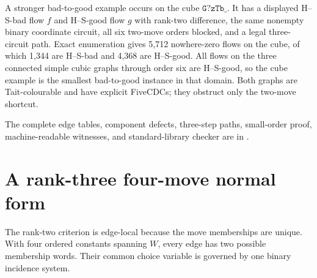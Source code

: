 \documentclass[11pt]{article}
\theoremstyle{definition}
\theoremstyle{remark}
\numberwithin{equation}{section}
\begin{document}
A stronger bad-to-good example occurs on the cube
\(\texttt{G?zTb\_}\).  It has a displayed H--S-bad flow \(f\) and
H--S-good flow \(g\) with rank-two difference, the same nonempty binary
coordinate circuit, all six two-move orders blocked, and a legal
three-circuit path.  Exact enumeration gives 5,712 nowhere-zero flows
on the cube, of which 1,344 are H--S-bad and 4,368 are H--S-good.
All flows on the three connected simple cubic graphs through order six
are H--S-good, so the cube example is the smallest bad-to-good instance
in that domain.  Both graphs are Tait-colourable and have explicit
FiveCDCs; they obstruct only the two-move shortcut.

The complete edge tables, component defects, three-step paths,
small-order proof, machine-readable witnesses, and standard-library
checker are in
{\footnotesize{}}.

\section{A rank-three four-move normal form}
\label{sec:rank-three}

The rank-two criterion is edge-local because the move memberships are
unique.  With four ordered constants spanning \(W\), every edge has two
possible membership words.  Their common choice variable is governed by
one binary incidence system.
\end{document}
